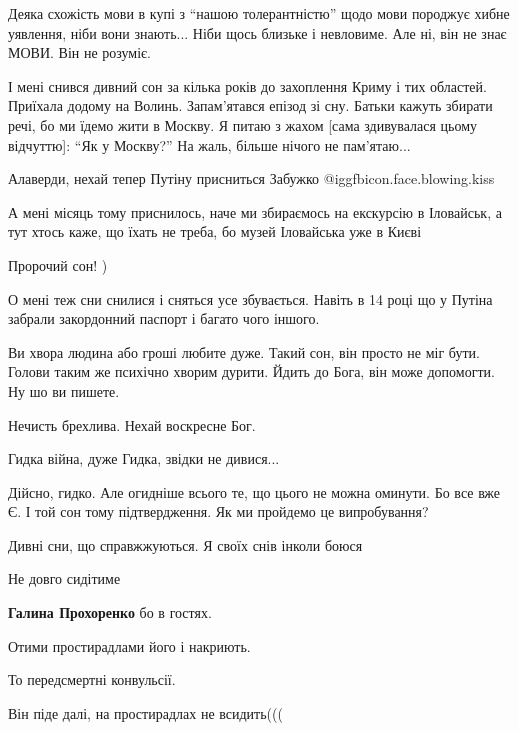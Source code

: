 \begin{itemize}
Деяка схожість мови в купі з \enquote{нашою толерантністю} щодо мови породжує хибне
уявлення, ніби вони знають... Ніби щось близьке і невловиме. Але ні, він не
знає МОВИ. Він не розуміє.


І мені снився дивний сон за кілька років до захоплення Криму і тих областей.
Приїхала додому на Волинь. Запам'ятався епізод зі сну. Батьки кажуть збирати
речі, бо ми їдемо жити в Москву. Я питаю з жахом [сама здивувалася цьому
відчуттю]: \enquote{Як у Москву?} На жаль, більше нічого не пам'ятаю...

Алаверди, нехай тепер Путіну присниться Забужко @igg{fbicon.face.blowing.kiss} 


А мені місяць тому приснилось, наче ми збираємось на екскурсію в Іловайськ, а
тут хтось каже, що їхать не треба, бо музей Іловайська уже в Києві

Пророчий сон! )


О мені теж сни снилися і сняться усе збувається. Навіть в 14 році що у Путіна
забрали закордонний паспорт і багато чого іншого.


Ви хвора людина або гроші любите дуже. Такий сон, він просто не міг бути.
Голови таким же психічно хворим дурити. Йдить до Бога, він може допомогти. Ну
шо ви пишете.

Нечисть брехлива. Нехай воскресне Бог.

Гидка війна, дуже Гидка, звідки не дивися...


Дійсно, гидко. Але огидніше всього те, що цього не можна оминути. Бо все вже Є.
І той сон тому підтвердження. Як ми пройдемо це випробування?

Дивні сни, що справжжуються. Я своїх снів інколи боюся

Не довго сидітиме

\textbf{Галина Прохоренко} бо в гостях.

Отими простирадлами його і накриють.

То передсмертні конвульсії.

Він піде далі, на простирадлах не всидить(((


\end{itemize}

